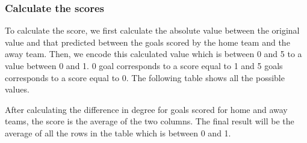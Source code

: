 \subsubsection{Calculate the scores}

To calculate the score, we first calculate the absolute value between the original value 
and that predicted between the goals scored by the home team and the away team.
Then, we encode this calculated value which is between 0 and 5 to a value between 0 and 1. 
0 goal corresponds to a score equal to 1 and 5 goals corresponds to a score equal to 0.
The following table shows all the possible values.


\begin{table}[H]
    \centering
    \caption{Calculate the degree difference}
    \label{table:qualitycriteriaround}
\end{table}

After calculating the difference in degree for goals scored for home and away teams, the score is the average of the two columns. The final result will be the average of all the rows in the table which is between 0 and 1.



